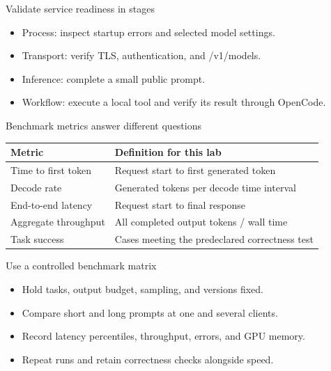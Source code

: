 \documentclass[aspectratio=169,11pt]{beamer}
\begin{document}
\begin{frame}[t,fragile]{Validate service readiness in stages}
\fontsize{11.5}{14}\selectfont
\begin{itemize}\setlength{\itemsep}{2mm}
\item Process: inspect startup errors and selected model settings.
\item Transport: verify TLS, authentication, and /v1/models.
\item Inference: complete a small public prompt.
\item Workflow: execute a local tool and verify its result through OpenCode.
\end{itemize}
\end{frame}
\begin{frame}[t,fragile]{Benchmark metrics answer different questions}
\fontsize{10.5}{12.5}\selectfont\setlength{\tabcolsep}{4pt}\renewcommand{\arraystretch}{1.15}
\begin{tabular}{>{\raggedright\arraybackslash}p{}>{\raggedright\arraybackslash}p{}}
\toprule
\textbf{Metric} & \textbf{Definition for this lab} \\ \midrule
Time to first token & Request start to first generated token \\[2pt]
Decode rate & Generated tokens per decode time interval \\[2pt]
End-to-end latency & Request start to final response \\[2pt]
Aggregate throughput & All completed output tokens / wall time \\[2pt]
Task success & Cases meeting the predeclared correctness test \\[2pt]
\bottomrule\end{tabular}\par\vspace{2mm}
\end{frame}
\begin{frame}[t,fragile]{Use a controlled benchmark matrix}
\fontsize{11.5}{14}\selectfont
\begin{itemize}\setlength{\itemsep}{2mm}
\item Hold tasks, output budget, sampling, and versions fixed.
\item Compare short and long prompts at one and several clients.
\item Record latency percentiles, throughput, errors, and GPU memory.
\item Repeat runs and retain correctness checks alongside speed.
\end{itemize}
\end{frame}
\end{document}
